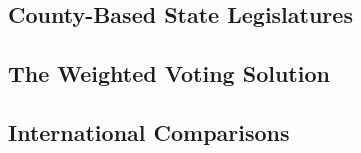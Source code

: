 
\subsection{County-Based State Legislatures}

\subsection{The Weighted Voting Solution}

\subsection{International Comparisons}
